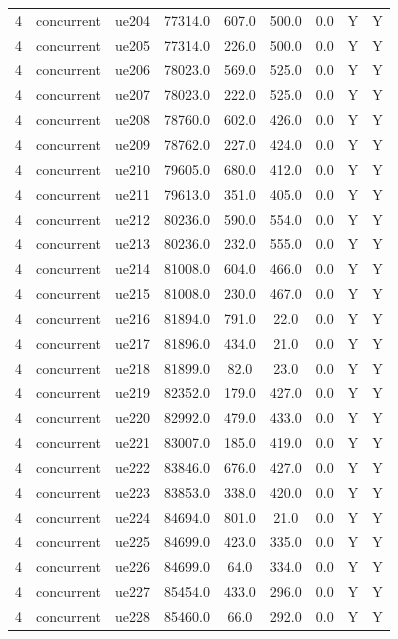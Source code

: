 \begin{table}[ht]
\begin{tabular}{|c|c|c|c|c|c|c|c|c|}
4 & concurrent & ue204 & 77314.0 & 607.0 & 500.0 & 0.0 & Y & Y \\
4 & concurrent & ue205 & 77314.0 & 226.0 & 500.0 & 0.0 & Y & Y \\
4 & concurrent & ue206 & 78023.0 & 569.0 & 525.0 & 0.0 & Y & Y \\
4 & concurrent & ue207 & 78023.0 & 222.0 & 525.0 & 0.0 & Y & Y \\
4 & concurrent & ue208 & 78760.0 & 602.0 & 426.0 & 0.0 & Y & Y \\
4 & concurrent & ue209 & 78762.0 & 227.0 & 424.0 & 0.0 & Y & Y \\
4 & concurrent & ue210 & 79605.0 & 680.0 & 412.0 & 0.0 & Y & Y \\
4 & concurrent & ue211 & 79613.0 & 351.0 & 405.0 & 0.0 & Y & Y \\
4 & concurrent & ue212 & 80236.0 & 590.0 & 554.0 & 0.0 & Y & Y \\
4 & concurrent & ue213 & 80236.0 & 232.0 & 555.0 & 0.0 & Y & Y \\
4 & concurrent & ue214 & 81008.0 & 604.0 & 466.0 & 0.0 & Y & Y \\
4 & concurrent & ue215 & 81008.0 & 230.0 & 467.0 & 0.0 & Y & Y \\
4 & concurrent & ue216 & 81894.0 & 791.0 & 22.0 & 0.0 & Y & Y \\
4 & concurrent & ue217 & 81896.0 & 434.0 & 21.0 & 0.0 & Y & Y \\
4 & concurrent & ue218 & 81899.0 & 82.0 & 23.0 & 0.0 & Y & Y \\
4 & concurrent & ue219 & 82352.0 & 179.0 & 427.0 & 0.0 & Y & Y \\
4 & concurrent & ue220 & 82992.0 & 479.0 & 433.0 & 0.0 & Y & Y \\
4 & concurrent & ue221 & 83007.0 & 185.0 & 419.0 & 0.0 & Y & Y \\
4 & concurrent & ue222 & 83846.0 & 676.0 & 427.0 & 0.0 & Y & Y \\
4 & concurrent & ue223 & 83853.0 & 338.0 & 420.0 & 0.0 & Y & Y \\
4 & concurrent & ue224 & 84694.0 & 801.0 & 21.0 & 0.0 & Y & Y \\
4 & concurrent & ue225 & 84699.0 & 423.0 & 335.0 & 0.0 & Y & Y \\
4 & concurrent & ue226 & 84699.0 & 64.0 & 334.0 & 0.0 & Y & Y \\
4 & concurrent & ue227 & 85454.0 & 433.0 & 296.0 & 0.0 & Y & Y \\
4 & concurrent & ue228 & 85460.0 & 66.0 & 292.0 & 0.0 & Y & Y \\

\end{tabular}
\end{table}
